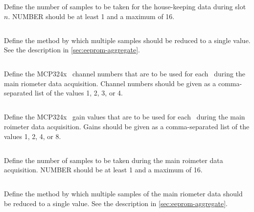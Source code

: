 Define the number of samples to be taken for the house-keeping data
during slot $n$. NUMBER should be at least 1 and a maximum of 16.


\subsection[rio-housekeeping-n-aggregate]{}

Define the method by which multiple samples should be reduced to a
single value. See the description in \ref{sec:eeprom-aggregate}.

\subsection[rio-riometer-adc-channel-list]{}

Define the MCP324x \adc\ channel numbers that are to be used for each
\adc\ during the main riometer data acquisition. Channel numbers
should be given as a comma-separated list of the values 1, 2, 3, or 4.

\subsection[rio-riometer-adc-gain-list]{}

Define the MCP324x \adc\ gain values that are to be used for each
\adc\ during the main roimeter data acquisition. Gains should be given
as a comma-separated list of the values 1, 2, 4, or 8.

\subsection[rio-riometer-num-samples]{}

Define the number of samples to be taken during the main roimeter data
acquisition. NUMBER should be at least 1 and a maximum of 16.

\subsection[rio-riometer-aggregate]{}

Define the method by which multiple samples of the main riometer data
should be reduced to a single value. See the description in
\ref{sec:eeprom-aggregate}.

